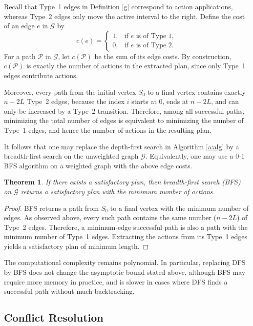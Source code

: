 \documentclass[]{jair}
\newtheorem{Theorem}{Theorem}
\begin{document}
Recall that Type~1 edges in Definition \ref{g} correspond to action applications, whereas
Type~2 edges only move the active interval to the right.
Define the cost of an edge $e$ in $\mathcal{G}$ by
\[
c(e)=
\begin{cases}
1, & \text{if $e$ is of Type~1},\\
0, & \text{if $e$ is of Type~2}.
\end{cases}
\]
For a path $\mathcal{P}$ in $\mathcal{G}$, let $c(\mathcal{P})$ be the sum of its edge costs.
By construction, $c(\mathcal{P})$ is exactly the number of actions in the extracted plan,
since only Type~1 edges contribute actions.

Moreover, every path from the initial vertex $S_0$ to a final vertex contains exactly
$n-2L$ Type~2 edges, because the index $i$ starts at $0$, ends at $n-2L$, and can only be
increased by a Type~2 transition. Therefore, among all successful paths, minimizing the total
number of edges is equivalent to minimizing the number of Type~1 edges, and hence the number
of actions in the resulting plan.

It follows that one may replace the depth-first search in Algorithm \ref{a:alg} by a
breadth-first search on the unweighted graph $\mathcal{G}$. 
Equivalently, one may use a 0-1 BFS algorithm on a weighted graph with the above edge costs.

\begin{Theorem}\label{t:shortest}
    If there exists a satisfactory plan, then breadth-first search (BFS) on $\mathcal{G}$ returns a
satisfactory plan with the minimum number of actions.
\end{Theorem}

\begin{proof}{}
BFS returns a path from $S_0$ to a final vertex with the minimum number of
edges. As observed above, every such path contains the same number ($n-2L$) of Type~2 edges.
Therefore, a minimum-edge successful path is also a path with the minimum number of Type~1 edges.
Extracting the actions from its Type~1 edges yields a satisfactory plan of minimum length.
\end{proof}

The computational complexity remains polynomial. In particular, replacing DFS by BFS
does not change the asymptotic bound stated above, although BFS may require more memory in practice,
and is slower in cases where DFS finds a successful path without much backtracking.

\subsection{Conflict Resolution}\label{softopt}
\end{document}

